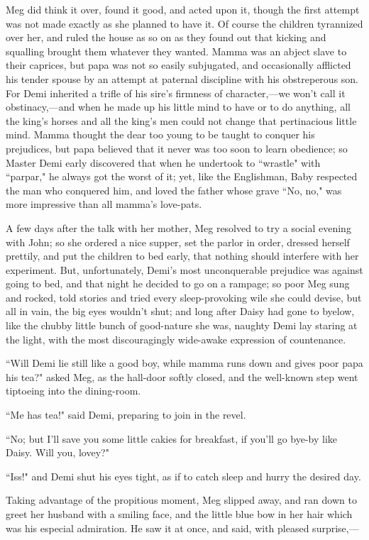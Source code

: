 Meg did think it over, found it good, and acted upon it, though the
first attempt was not made exactly as she planned to have it. Of course
the children tyrannized over her, and ruled the house as so on as they
found out that kicking and squalling brought them whatever they wanted.
Mamma was an abject slave to their caprices, but papa was not so easily
subjugated, and occasionally afflicted his tender spouse by an attempt
at paternal discipline with his obstreperous son. For Demi inherited a
trifle of his sire's firmness of character,---we
won't call it obstinacy,---and when he made up his
little mind to have or to do anything, all the king's
horses and all the king's men could not change that
pertinacious little mind. Mamma thought the dear too young to be taught
to conquer his prejudices, but papa believed that it never was too soon
to learn obedience; so Master Demi early discovered that when he
undertook to ``wrastle" with ``parpar," he always got the worst of it;
yet, like the Englishman, Baby respected the man who conquered him, and
loved the father whose grave ``No, no," was more impressive than all
mamma's love-pats.

A few days after the talk with her mother, Meg resolved to try a social
evening with John; so she ordered a nice supper, set the parlor in
order, dressed herself prettily, and put the children to bed early, that
nothing should interfere with her experiment. But, unfortunately,
Demi's most unconquerable prejudice was against going to
bed, and that night he decided to go on a rampage; so poor Meg sung and
rocked, told stories and tried every sleep-provoking wile she could
devise, but all in vain, the big eyes wouldn't shut; and
long after Daisy had gone to byelow, like the chubby little bunch of
good-nature she was, naughty Demi lay staring at the light, with the
most discouragingly wide-awake expression of countenance.

``Will Demi lie still like a good boy, while mamma runs down and gives
poor papa his tea?" asked Meg, as the hall-door softly closed, and the
well-known step went tiptoeing into the dining-room.

``Me has tea!" said Demi, preparing to join in the revel.

``No; but I'll save you some little cakies for breakfast,
if you'll go bye-by like Daisy. Will you, lovey?"

``Iss!" and Demi shut his eyes tight, as if to catch sleep and hurry the
desired day.

Taking advantage of the propitious moment, Meg slipped away, and ran
down to greet her husband with a smiling face, and the little blue bow
in her hair which was his especial admiration. He saw it at once, and
said, with pleased surprise,---

